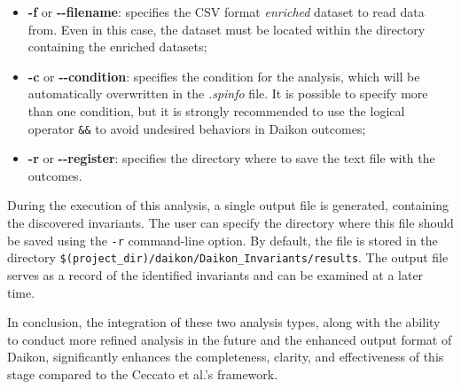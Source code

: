 \begin{itemize}
	\item \textbf{-f} or \textbf{{-}{-}filename}: specifies the CSV format \textit{enriched} dataset to read data from. Even in this case, the dataset must be located within the directory containing the enriched datasets;
	\item \textbf{-c} or \textbf{{-}{-}condition}: specifies the condition for the analysis, which will be automatically overwritten in the \textit{.spinfo} file. It is possible to specify more than one condition, but it is strongly recommended to use the logical operator \texttt{\&\&} to avoid undesired behaviors in Daikon outcomes;
	\item \textbf{-r} or \textbf{{-}{-}register}: specifies the directory where to save the text file with the outcomes.
\end{itemize}
During the execution of this analysis, a single output file is generated, containing the discovered invariants. The user can specify the directory where this file should be saved using the \texttt{-r} command-line option. By default, the file is stored in the directory \texttt{\$(project\_dir)/daikon/Daikon\_Invariants/results}. The output file serves as a record of the identified invariants and can be examined at a later time. 

\bigskip
In conclusion, the integration of these two analysis types, along with the ability to conduct more refined analysis in the future and the enhanced output format of Daikon, significantly enhances the completeness, clarity, and effectiveness of this stage compared to the Ceccato et al.'s framework.


